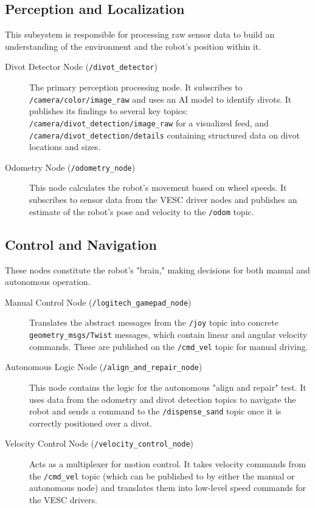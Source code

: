 \subsection{Perception and Localization}
This subsystem is responsible for processing raw sensor data to build an understanding of the environment and the robot's position within it.
\begin{description}
    \item[Divot Detector Node (\texttt{/divot\_detector})] The primary perception processing node. It subscribes to \texttt{/camera/color/image\_raw} and uses an AI model to identify divots. It publishes its findings to several key topics: \texttt{/camera/divot\_detection/image\_raw} for a visualized feed, and \texttt{/camera/divot\_detection/details} containing structured data on divot locations and sizes.
    \item[Odometry Node (\texttt{/odometry\_node})] This node calculates the robot's movement based on wheel speeds. It subscribes to sensor data from the VESC driver nodes and publishes an estimate of the robot's pose and velocity to the \texttt{/odom} topic.
\end{description}

\subsection{Control and Navigation}
These nodes constitute the robot's "brain," making decisions for both manual and autonomous operation.
\begin{description}
    \item[Manual Control Node (\texttt{/logitech\_gamepad\_node})] Translates the abstract messages from the \texttt{/joy} topic into concrete \texttt{geometry\_msgs/Twist} messages, which contain linear and angular velocity commands. These are published on the \texttt{/cmd\_vel} topic for manual driving.
    \item[Autonomous Logic Node (\texttt{/align\_and\_repair\_node})] This node contains the logic for the autonomous "align and repair" test. It uses data from the odometry and divot detection topics to navigate the robot and sends a command to the \texttt{/dispense\_sand} topic once it is correctly positioned over a divot.
    \item[Velocity Control Node (\texttt{/velocity\_control\_node})] Acts as a multiplexer for motion control. It takes velocity commands from the \texttt{/cmd\_vel} topic (which can be published to by either the manual or autonomous node) and translates them into low-level speed commands for the VESC drivers.
\end{description}

